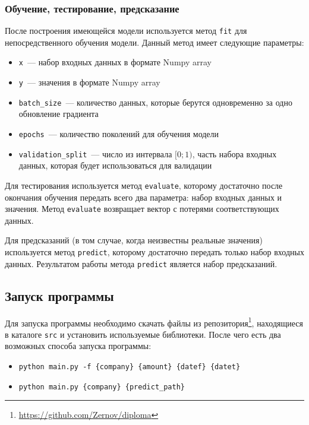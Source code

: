 \documentclass[14pt]{matmex-diploma-custom}
\begin{document}
\subsubsection{Обучение, тестирование, предсказание}

После построения имеющейся модели используется метод \texttt{fit} для непосредственного обучения модели. Данный метод имеет следующие параметры:

\begin{itemize}
\item \texttt{x}~--- набор входных данных в формате Numpy array
\item \texttt{y}~--- значения в формате Numpy array
\item \texttt{batch\_size}~--- количество данных, которые берутся одновременно за одно обновление градиента
\item \texttt{epochs}~--- количество поколений для обучения модели
\item \texttt{validation\_split}~--- число из интервала $[0;1)$, часть набора входных данных, которая будет использоваться для валидации
\end{itemize}


Для тестирования используется метод \texttt{evaluate}, которому достаточно после окончания обучения передать всего два параметра: набор входных данных и значения. Метод \texttt{evaluate} возвращает вектор с потерями соответствующих данных.

Для предсказаний (в том случае, когда неизвестны реальные значения) используется метод \texttt{predict}, которому достаточно передать только набор входных данных. Результатом работы метода \texttt{predict} является набор предсказаний.

\subsection{Запуск программы}

Для запуска программы необходимо скачать файлы из репозитория\footnote{\url{https://github.com/Zernov/diploma}}, находящиеся в каталоге \texttt{src} и установить используемые библиотеки. После чего есть два возможных способа запуска программы:

\begin{itemize}
\item \texttt{python main.py -f \{company\} \{amount\} \{datef\} \{datet\}}
\item \texttt{python main.py \{company\} \{predict\_path\}}
\end{itemize}
\end{document}
